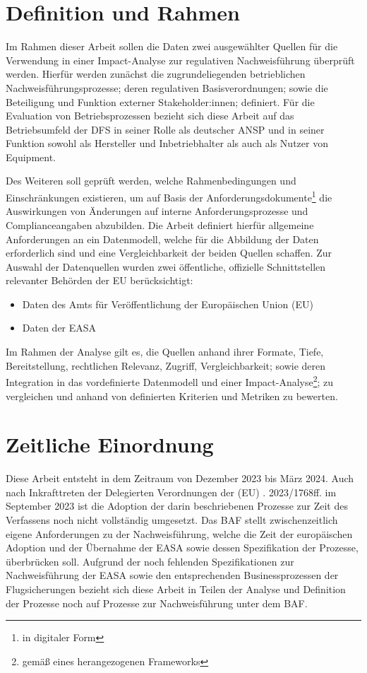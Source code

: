 \pagebreak
\section{Definition und Rahmen}

    Im Rahmen dieser Arbeit sollen die Daten zwei ausgewählter Quellen für die Verwendung in einer Impact-Analyse zur regulativen Nachweisführung überprüft werden.
    Hierfür werden zunächst die zugrundeliegenden betrieblichen Nachweisführungsprozesse; deren regulativen Basisverordnungen; sowie die Beteiligung und Funktion externer Stakeholder:innen; definiert.
    Für die Evaluation von Betriebsprozessen bezieht sich diese Arbeit auf das Betriebsumfeld der \ac{DFS} in seiner Rolle als deutscher \ac{ANSP} und in seiner Funktion sowohl als Hersteller und Inbetriebhalter als auch als Nutzer von \atmans{} Equipment.

    \medskip
    Des Weiteren soll geprüft werden, welche Rahmenbedingungen und Einschränkungen existieren, um auf Basis der Anforderungsdokumente\footnote{in digitaler Form} die Auswirkungen von Änderungen auf interne Anforderungsprozesse und Complianceangaben abzubilden.
    Die Arbeit definiert hierfür allgemeine Anforderungen an ein Datenmodell, welche für die Abbildung der Daten erforderlich sind und eine Vergleichbarkeit der beiden Quellen schaffen. 
    Zur Auswahl der Datenquellen wurden zwei öffentliche, offizielle Schnittstellen relevanter Behörden der \ac{EU} berücksichtigt:  
    
    \begin{itemize}
        \item Daten des Amts für Veröffentlichung der Europäischen Union (\acs{EU})
        \item Daten der \ac{EASA}
    \end{itemize}

    \noindent
    Im Rahmen der Analyse gilt es, die Quellen anhand ihrer Formate, Tiefe, Bereitstellung, rechtlichen Relevanz, Zugriff, Vergleichbarkeit; sowie deren Integration in das vordefinierte Datenmodell und einer Impact-Analyse\footnote{gemäß eines herangezogenen Frameworks}; zu vergleichen und anhand von definierten Kriterien und Metriken zu bewerten.
    
\section{Zeitliche Einordnung}

    Diese Arbeit entsteht in dem Zeitraum von Dezember 2023 bis März 2024.
    Auch nach Inkrafttreten der Delegierten Verordnungen der (\ac{EU}) . 2023/\-1768ff. im September 2023 ist die Adoption der darin beschriebenen Prozesse zur Zeit des Verfassens noch nicht vollständig umgesetzt. 
    Das \ac{BAF} stellt zwischenzeitlich eigene Anforderungen zu der Nachweisführung, welche die Zeit der europäischen Adoption und der Übernahme der \ac{EASA} sowie dessen Spezifikation der Prozesse, überbrücken soll.
    Aufgrund der noch fehlenden Spezifikationen zur Nachweisführung der \ac{EASA} sowie den entsprechenden Businessprozessen der Flugsicherungen bezieht sich diese Arbeit in Teilen der Analyse und Definition der Prozesse noch auf Prozesse zur Nachweisführung unter dem \ac{BAF}. 
